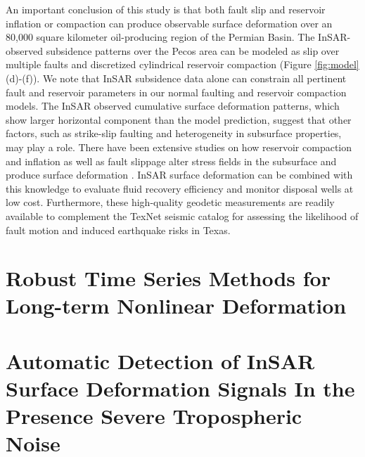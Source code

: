 \documentclass{utexasthesis}
\begin{document}
An important conclusion of this study is that both fault slip and reservoir inflation or compaction can produce observable surface deformation over an 80,000 square kilometer oil-producing region of the Permian Basin. The InSAR-observed subsidence patterns over the Pecos area can be modeled as slip over multiple faults and discretized cylindrical reservoir compaction (Figure \ref{fig:model} (d)-(f)). We note that InSAR subsidence data alone can constrain all pertinent fault and reservoir parameters in our normal faulting and reservoir compaction models. The InSAR observed cumulative surface deformation patterns, which show larger horizontal component than the model prediction, suggest that other factors, such as strike-slip faulting and heterogeneity in subsurface properties, may play a role. There have been extensive studies on how reservoir compaction and inflation as well as fault slippage alter stress fields in the subsurface and produce surface deformation \citep{Geertsma1973LandSubsidenceCompacting,Segall1992InducedStressesDue,Okada1992InternalDeformationDue,Du1992ComparisonVariousInversion,Vasco2005UseQuasiStatic,Vasco2008ReservoirMonitoringCharacterization,Khakim2012GeomechanicalModelingInsar}. InSAR surface deformation can be combined with this knowledge to evaluate fluid recovery efficiency and monitor disposal wells at low cost. Furthermore, these high-quality geodetic measurements are readily available to complement the TexNet seismic catalog for assessing the likelihood of fault motion and induced earthquake risks in Texas.





\chapter{Robust Time Series Methods for Long-term Nonlinear Deformation}
\label{CHAP:5-atmo-noise}






\chapter{Automatic Detection of InSAR Surface Deformation Signals In the Presence Severe Tropospheric Noise}
\end{document}
